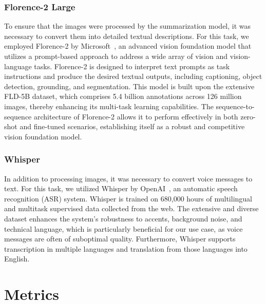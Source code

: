 \documentclass[10pt,twocolumn,letterpaper]{article}
\begin{document}
\subsubsection{Florence-2 Large}

\hspace{1em}To ensure that the images were processed by the summarization model, it was necessary to convert them into detailed textual descriptions. 
For this task, we employed Florence-2 by Microsoft~\cite{xiao2023florence2advancingunifiedrepresentation}, an advanced vision foundation model that utilizes a prompt-based approach to address a wide array of vision and vision-language tasks. 
Florence-2 is designed to interpret text prompts as task instructions and produce the desired textual outputs, including captioning, object detection, grounding, and segmentation. 
This model is built upon the extensive FLD-5B dataset, which comprises 5.4 billion annotations across 126 million images, thereby enhancing its multi-task learning capabilities. 
The sequence-to-sequence architecture of Florence-2 allows it to perform effectively in both zero-shot and fine-tuned scenarios, establishing itself as a robust and competitive vision foundation model.

\subsubsection{Whisper}

\hspace{1em}In addition to processing images, it was necessary to convert voice messages to text. 
For this task, we utilized Whisper by OpenAI~\cite{radford2022robustspeechrecognitionlargescale}, an automatic speech recognition (ASR) system. 
Whisper is trained on 680,000 hours of multilingual and multitask supervised data collected from the web. 
The extensive and diverse dataset enhances the system's robustness to accents, background noise, and technical language, which is particularly beneficial for our use case, as voice messages are often of suboptimal quality. 
Furthermore, Whisper supports transcription in multiple languages and translation from those languages into English.

\section{Metrics}
\end{document}
